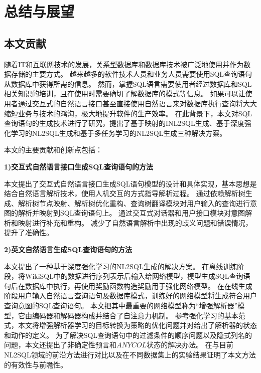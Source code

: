 \chapter{总结与展望}
\label{chap:conculution}
\section{本文贡献}

随着IT和互联网技术的发展，关系型数据库和数据库技术被广泛地使用并作为数据存储的主要方式。
越来越多的软件技术人员和业务人员需要使用SQL查询语句从数据库中获得所需的信息。
然而，掌握SQL语言需要使用者经过数据库和SQL相关知识的培训，且在使用时需要确切了解数据库的模式等信息。
如果可以让使用者通过交互式的自然语言接口甚至直接使用自然语言来对数据库执行查询将大大缩短业务与技术的鸿沟，极大地提升软件的生产效率。
在此背景下，本文对SQL查询语句的生成技术进行了研究，提出了基于映射的INL2SQL生成、基于深度强化学习的NL2SQL生成和基于多任务学习的NL2SQL生成三种解决方案。

本文的主要贡献和创新点包括：

\textbf{1)交互式自然语言接口生成SQL查询语句的方法}

本文提出了交互式自然语言接口生成SQL语句模型的设计和具体实现，基本思想是结合自然语言解析技术，使用人机交互的方式指导解析过程。
通过依赖解析树生成、解析树节点映射、解析树优化重构、查询树翻译模块对用户输入的查询进行意图的解析并映射到SQL查询语句上。
通过交互式对话器和用户接口模块对意图解析和映射进行补充和重构。
减少了自然语言解析中出现的歧义问题和错误情况，提升了准确性。


\textbf{2)英文自然语言生成SQL查询语句的方法}

本文提出了一种基于深度强化学习的NL2SQL生成的解决方案。
在离线训练阶段，将WikiSQL中的数据进行序列表示后输入给网络模型，模型生成SQL查询语句后在数据库中执行，再使用奖励函数构造奖励用于强化网络模型。
在在线生成阶段用户输入自然语言查询语句及数据库模式，训练好的网络模型将生成符合用户查询意图的SQL查询语句。
本文把其中最重要的网络模型称为“增强解析器”模型，它由编码器和解码器构成并结合了自注意力机制。
参考强化学习的基本范式，本文将增强解析器学习的目标转换为策略的优化问题并对给出了解析器的状态和动作的定义。
为了解决SQL查询语句中的过滤条件的顺序问题以及隐式列名的问题，本文还提出了非确定性预言和$ANYCOL$状态的解决办法。
在与目前NL2SQL领域的前沿方法进行对比以及在不同数据集上的实验结果证明了本文方法的有效性与前瞻性。

